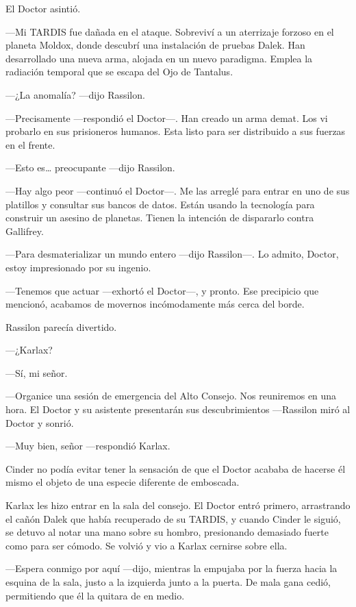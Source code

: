 El Doctor asintió. 

—Mi TARDIS fue dañada en el ataque. Sobreviví a un aterrizaje forzoso en el planeta Moldox, donde descubrí una instalación de pruebas Dalek. Han desarrollado una nueva arma, alojada en un nuevo paradigma. Emplea la radiación temporal que se escapa del Ojo de Tantalus.

—¿La anomalía? —dijo Rassilon.

—Precisamente —respondió el Doctor—. Han creado un arma demat. Los vi probarlo en sus prisioneros humanos. Esta listo para ser distribuido a sus fuerzas en el frente.

—Esto es… preocupante —dijo Rassilon.

—Hay algo peor —continuó el Doctor—. Me las arreglé para entrar en uno de sus platillos y consultar sus bancos de datos. Están usando la tecnología para construir un asesino de planetas. Tienen la intención de dispararlo contra Gallifrey.

—Para desmaterializar un mundo entero —dijo Rassilon—. Lo admito, Doctor, estoy impresionado por su ingenio.

—Tenemos que actuar —exhortó el Doctor—, y pronto. Ese precipicio que mencionó, acabamos de movernos incómodamente más cerca del borde.

Rassilon parecía divertido. 

—¿Karlax?

—Sí, mi señor.

—Organice una sesión de emergencia del Alto Consejo. Nos reuniremos en una hora. El Doctor y su asistente presentarán sus descubrimientos —Rassilon miró al Doctor y sonrió.

—Muy bien, señor —respondió Karlax.

Cinder no podía evitar tener la sensación de que el Doctor acababa de hacerse él mismo el objeto de una especie diferente de emboscada.

\mbox{}

Karlax les hizo entrar en la sala del consejo. El Doctor entró primero, arrastrando el cañón Dalek que había recuperado de su TARDIS, y cuando Cinder le siguió, se detuvo al notar una mano sobre su hombro, presionando demasiado fuerte como para ser cómodo. Se volvió y vio a Karlax cernirse sobre ella.

—Espera conmigo por aquí —dijo, mientras la empujaba por la fuerza hacia la esquina de la sala, justo a la izquierda junto a la puerta. De mala gana cedió, permitiendo que él la quitara de en medio.

